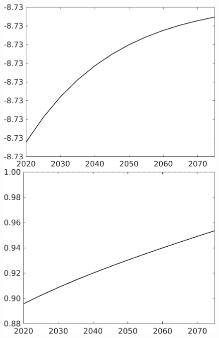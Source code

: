 \documentclass[12pt]{article}
\begin{document}
\begin{figure}[h!!]
\begin{minipage}[]{0.32\textwidth}
\end{minipage}	
\begin{minipage}[]{0.32\textwidth}
\includegraphics[width=1\textwidth]{../../codding_model/own_basedOnFried/optimalPol_010922_revision/figures/all_13Sept22/CompTaul_Equlab_LFBAUPer_Reg0_G_spillover0_nsk0_xgr1_knspil1_sep1_countec0_GovRev0_etaa0.79.png}
\end{minipage}	
	\begin{minipage}[]{0.32\textwidth}
		\includegraphics[width=1\textwidth]{../../codding_model/own_basedOnFried/optimalPol_010922_revision/figures/all_13Sept22/CompTaul_Equlab_LFBAU_Reg0_lambdaa_spillover0_nsk0_xgr1_knspil1_sep1_countec0_GovRev0_etaa0.79_lgd0.png}

\end{minipage}
\end{figure}
\end{document}
